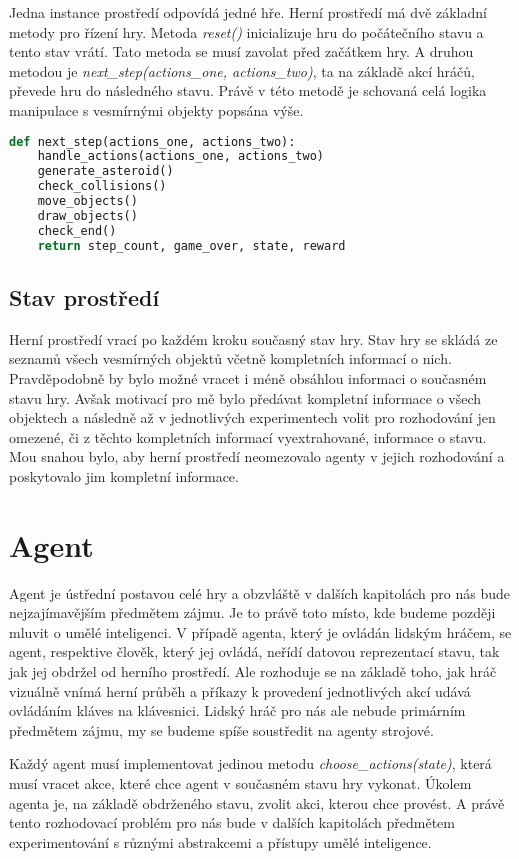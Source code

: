 Jedna instance prostředí odpovídá jedné hře. Herní prostředí má dvě základní metody pro řízení hry. 
\newline 
Metoda \emph{reset()} inicializuje hru do počátečního stavu a tento stav vrátí. Tato metoda se musí zavolat před začátkem hry.
\newline 
A druhou metodou je \emph{next\_step(actions\_one, actions\_two)}, ta na základě akcí hráčů, převede hru do následného stavu.
Právě v této metodě je schovaná celá logika manipulace s vesmírnými objekty popsána výše.
\newline
\begin{lstlisting}[language=Python]
def next_step(actions_one, actions_two):
    handle_actions(actions_one, actions_two)
    generate_asteroid()
    check_collisions()
    move_objects()
    draw_objects()
    check_end()
    return step_count, game_over, state, reward    
\end{lstlisting}
\newpage



\subsection{Stav prostředí}
Herní prostředí vrací po každém kroku současný stav hry. Stav hry se skládá ze seznamů všech vesmírných objektů včetně kompletních informací o nich.
Pravděpodobně by bylo možné vracet i méně obsáhlou informaci o současném stavu hry. 
Avšak motivací pro mě bylo předávat kompletní informace o všech objektech a následně až v jednotlivých experimentech volit pro rozhodování jen omezené, či z těchto kompletních informací vyextrahované, informace o stavu.
Mou snahou bylo, aby herní prostředí neomezovalo agenty v jejich rozhodování a poskytovalo jim kompletní informace.


\section{Agent}
Agent je ústřední postavou celé hry a obzvláště v dalších kapitolách pro nás bude nejzajímavějším předmětem zájmu.
Je to právě toto místo, kde budeme později mluvit o umělé inteligenci. 
V případě agenta, který je ovládán lidským hráčem, se agent, respektive člověk, který jej ovládá, neřídí datovou reprezentací stavu, tak jak jej obdržel od herního prostředí.
Ale rozhoduje se na základě toho, jak hráč vizuálně vnímá herní průběh a příkazy k provedení jednotlivých akcí udává ovládáním kláves na klávesnici.
Lidský hráč pro nás ale nebude primárním předmětem zájmu, my se budeme spíše soustředit na agenty strojové.
\par
Každý agent musí implementovat jedinou metodu \emph{choose\_actions(state)}, která musí vracet akce, které chce agent v současném stavu hry vykonat. Úkolem agenta je, na základě obdrženého stavu, zvolit akci, kterou chce provést.
A právě tento rozhodovací problém pro nás bude v dalších kapitolách předmětem experimentování s různými abstrakcemi a přístupy umělé inteligence. 


